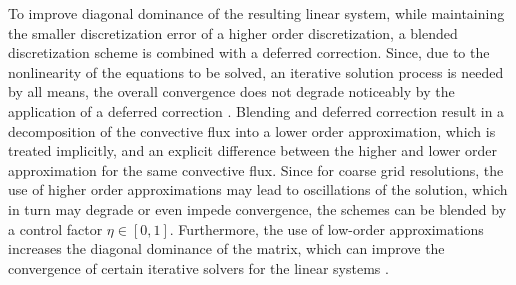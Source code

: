 To improve diagonal dominance of the resulting linear system, while maintaining the smaller discretization error of a higher order discretization, a blended discretization scheme is combined with a deferred correction. Since, due to the nonlinearity of the equations to be solved, an iterative solution process is needed by all means, the overall convergence does not degrade noticeably by the application of a deferred correction \cite{ferziger02}. Blending and deferred correction result in a decomposition of the convective flux into a lower order approximation, which is treated implicitly, and an explicit difference between the higher and lower order approximation for the same convective flux. Since for coarse grid resolutions, the use of higher order approximations may lead to oscillations of the solution, which in turn may degrade or even impede convergence, the schemes can be blended by a control factor \( \eta \in [0,1]\). Furthermore, the use of low-order approximations increases the diagonal dominance of the matrix, which can improve the convergence of certain iterative solvers for the linear systems \cite{schaefer99}.

